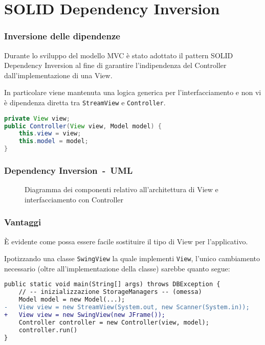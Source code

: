 \section{SOLID Dependency Inversion}
\begin{frame}[fragile]
    \frametitle{Inversione delle dipendenze}

    Durante lo sviluppo del modello MVC è stato adottato il pattern SOLID Dependency Inversion al fine di garantire l'indipendenza del Controller dall'implementazione di una View.\pause%
    
    In particolare viene mantenuta una logica generica per l'interfacciamento e non vi è dipendenza diretta tra \texttt{StreamView} e \texttt{Controller}.\pause%

    \lstset{style=java}
    \begin{lstlisting}[language=java, caption={Snippet tratto dal costruttore di Controller}]
private View view;
public Controller(View view, Model model) {
    this.view = view;
    this.model = model;
}
    \end{lstlisting}
\end{frame}

\begin{frame}
    \frametitle{Dependency Inversion~-~UML}
    \begin{figure}
        \centering
        \caption{Diagramma dei componenti relativo all'architettura di View e interfacciamento con Controller}
    \end{figure}
\end{frame}

\begin{frame}[fragile]
    \frametitle{Vantaggi}

    È evidente come possa essere facile sostituire il tipo di View per l'applicativo.

    Ipotizzando una classe \texttt{SwingView} la quale implementi \texttt{View}, l'unico cambiamento necessario (oltre all'implementazione della classe) sarebbe quanto segue:

    \lstset{style=java}
    \begin{lstlisting}[language=diff, caption={EntryPoint.java\#main}]
public static void main(String[] args) throws DBException {
    // -- inizializzazione StorageManagers -- (omessa)
    Model model = new Model(...);
-   View view = new StreamView(System.out, new Scanner(System.in));
+   View view = new SwingView(new JFrame());
    Controller controller = new Controller(view, model);
    controller.run()
}
    \end{lstlisting}
\end{frame}
